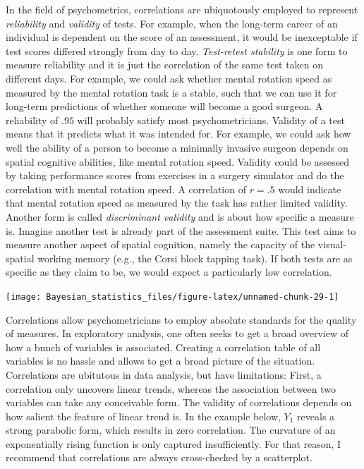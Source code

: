 \documentclass[]{svmono}
\newenvironment{Shaded}{\begin{snugshade}}{\end{snugshade}}
\newcommand{\KeywordTok}[1]{\textcolor[rgb]{0.13,0.29,0.53}{\textbf{#1}}}
\newcommand{\StringTok}[1]{\textcolor[rgb]{0.31,0.60,0.02}{#1}}
\newcommand{\OperatorTok}[1]{\textcolor[rgb]{0.81,0.36,0.00}{\textbf{#1}}}
\newcommand{\NormalTok}[1]{#1}
\begin{document}
In the field of psychometrics, correlations are ubiquotously employed to
represent \emph{reliability} and \emph{validity} of tests. For example,
when the long-term career of an individual is dependent on the score of
an assessment, it would be inexceptable if test scores differed strongly
from day to day. \emph{Test-retest stability} is one form to measure
reliability and it is just the correlation of the same test taken on
different days. For example, we could ask whether mental rotation speed
as measured by the mental rotation task is a stable, such that we can
use it for long-term predictions of whether someone will become a good
surgeon. A reliability of \(.95\) will probably satisfy most
psychometricians. Validity of a test means that it predicts what it was
intended for. For example, we could ask how well the ability of a person
to become a minimally invasive surgeon depends on spatial cognitive
abilities, like mental rotation speed. Validity could be assessed by
taking performance scores from exercises in a surgery simulator and do
the correlation with mental rotation speed. A correlation of \(r = .5\)
would indicate that mental rotation speed as measured by the task has
rather limited validity. Another form is called \emph{discriminant
validity} and is about how specific a measure is. Imagine another test
is already part of the assessment suite. This test aims to measure
another aspect of spatial cognition, namely the capacity of the
visual-spatial working memory (e.g., the Corsi block tapping task). If
both tests are as specific as they claim to be, we would expect a
particularly low correlation.

\begin{Shaded}
\end{Shaded}

\texttt{[image: Bayesian\_statistics\_files/figure-latex/unnamed-chunk-29-1]}

Correlations allow psychometricians to employ absolute standards for the
quality of measures. In exploratory analysis, one often seeks to get a
broad overview of how a bunch of variables is associated. Creating a
correlation table of all variables is no hassle and allows to get a
broad picture of the situation. Correlations are ubitutous in data
analysis, but have limitations: First, a correlation only uncovers
linear trends, whereas the association between two variables can take
any conceivable form. The validity of correlations depends on how
salient the feature of linear trend is. In the example below, \(Y_1\)
reveals a strong parabolic form, which results in zero correlation. The
curvature of an exponentially rising function is only captured
insufficiently. For that reason, I recommend that correlations are
always cross-checked by a scatterplot.
\end{document}
